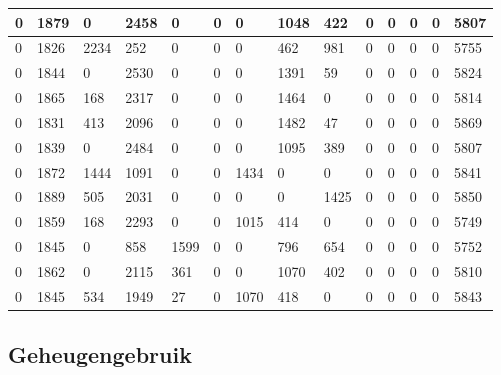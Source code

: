 \begin{tabular}{ | l | l | l | l | l | l | l | l | l | l | l | l | l | |l | }
	0 & 1879 & 0 & 2458 & 0 & 0 & 0 & 1048 & 422 & 0 & 0 & 0 & 0 & 5807 \\ \hline
	0 & 1826 & 2234 & 252 & 0 & 0 & 0 & 462 & 981 & 0 & 0 & 0 & 0 & 5755 \\ \hline
	0 & 1844 & 0 & 2530 & 0 & 0 & 0 & 1391 & 59 & 0 & 0 & 0 & 0 & 5824 \\ \hline
	0 & 1865 & 168 & 2317 & 0 & 0 & 0 & 1464 & 0 & 0 & 0 & 0 & 0 & 5814 \\ \hline
	0 & 1831 & 413 & 2096 & 0 & 0 & 0 & 1482 & 47 & 0 & 0 & 0 & 0 & 5869 \\ \hline
	0 & 1839 & 0 & 2484 & 0 & 0 & 0 & 1095 & 389 & 0 & 0 & 0 & 0 & 5807 \\ \hline
	0 & 1872 & 1444 & 1091 & 0 & 0 & 1434 & 0 & 0 & 0 & 0 & 0 & 0 & 5841 \\ \hline
	0 & 1889 & 505 & 2031 & 0 & 0 & 0 & 0 & 1425 & 0 & 0 & 0 & 0 & 5850 \\ \hline
	0 & 1859 & 168 & 2293 & 0 & 0 & 1015 & 414 & 0 & 0 & 0 & 0 & 0 & 5749 \\ \hline
	0 & 1845 & 0 & 858 & 1599 & 0 & 0 & 796 & 654 & 0 & 0 & 0 & 0 & 5752 \\ \hline
	0 & 1862 & 0 & 2115 & 361 & 0 & 0 & 1070 & 402 & 0 & 0 & 0 & 0 & 5810 \\ \hline
	0 & 1845 & 534 & 1949 & 27 & 0 & 1070 & 418 & 0 & 0 & 0 & 0 & 0 & 5843 \\ \hline
\end{tabular}


\subsection{ Geheugengebruik}
